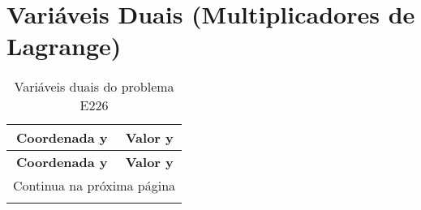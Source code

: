 \documentclass[12pt]{article}
\begin{document}
\begin{longtable}{@{}cccc@{}}
\end{longtable}

\section{Variáveis Duais (Multiplicadores de Lagrange)}

\begin{longtable}{@{}cc@{}}
\caption{Variáveis duais do problema E226} \\
\toprule
\textbf{Coordenada y} & \textbf{Valor y} \\
\midrule
\endfirsthead

\toprule
\textbf{Coordenada y} & \textbf{Valor y} \\
\midrule
\endhead

\midrule \multicolumn{2}{r}{{Continua na próxima página}} \\ \midrule
\endfoot


\end{longtable}
\end{document}
